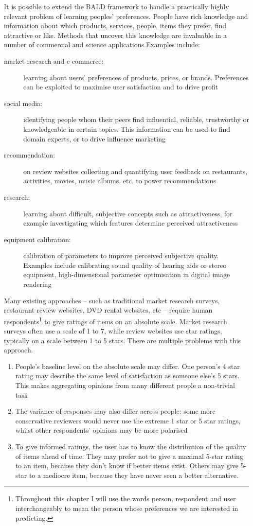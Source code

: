 It is possible to extend the BALD framework to handle a practically highly relevant problem of learning peoples' preferences. People have rich knowledge and information about which products, services, people, items they prefer, find attractive or like. Methods that uncover this knowledge are invaluable in a number of commercial and science applications.Examples include:
\begin{description}
	\item [market research and e-commerce:] learning about users' preferences of products, prices, or brands. Preferences can be exploited to maximise user satisfaction and to drive profit
	\item [social media:] identifying people whom their peers find influential, reliable, trustworthy or knowledgeable in certain topics. This information can be used to find domain experts, or to drive influence marketing
	\item [recommendation:] on review websites collecting and quantifying user feedback on restaurants, activities, movies, music albums, etc. to power recommendations
	\item [research:] learning about difficult, subjective concepts such as attractiveness, for example investigating which features determine perceived attractiveness
	\item [equipment calibration:] calibration of parameters to improve perceived subjective quality. Examples include calibrating sound quality of hearing aids or stereo equipment, high-dimensional parameter optimisation in digital image rendering
\end{description}

Many existing approaches -- such as traditional market research surveys, restaurant review websites, DVD rental websites, etc -- require human respondents\footnote{Throughout this chapter I will use the words person, respondent and user interchangeably to mean the person whose preferences we are interested in predicting.} to give ratings of items on an absolute scale. Market research surveys often use a scale of 1 to 7, while review websites use star ratings, typically on a scale between 1 to 5 stars. There are multiple problems with this approach.
\begin{enumerate}
	\item People's baseline level on the absolute scale may differ. One person's 4 star rating may describe the same level of satisfaction as someone else's 5 stars. This makes aggregating opinions from many different people a non-trivial task
	\item The variance of responses may also differ across people: some more conservative reviewers would never use the extreme 1 star or 5 star ratings, whilst other respondents' opinions may be more polarised
	\item To give informed ratings, the user has to know the distribution of the quality of items ahead of time. They may prefer not to give a maximal 5-star rating to an item, because they don't know if better items exist. Others may give 5-star to a mediocre item, because they have never seen a better alternative.
\end{enumerate} 


